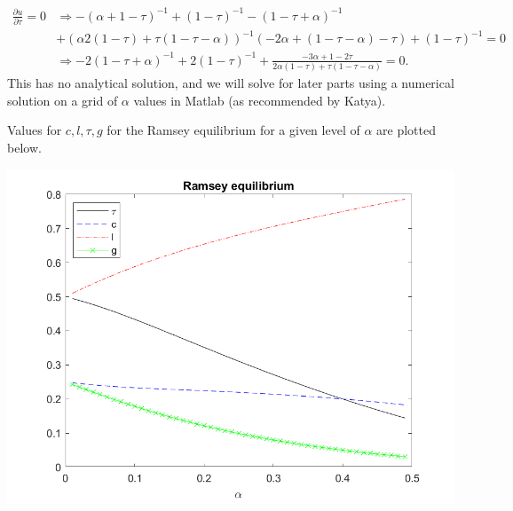 \documentclass[11pt]{article} %
\begin{document}
\begin{align*}
\frac{\partial u}{\partial \tau} = 0 &\Rightarrow -(\alpha +1-\tau)^{-1} + (1-\tau)^{-1} - (1-\tau+\alpha)^{-1} \\&+ (\alpha 2(1-\tau) + \tau (1-\tau - \alpha))^{-1}(-2\alpha + (1-\tau-\alpha)-\tau) +(1-\tau)^{-1} =0\\
&\Rightarrow -2(1-\tau+\alpha)^{-1} + 2(1-\tau)^{-1} +\frac{-3\alpha + 1 - 2\tau}{2\alpha(1-\tau) + \tau(1-\tau-\alpha)} = 0.
\end{align*}
This has no analytical solution, and we will solve for later parts using a numerical solution on a grid of $\alpha$ values in Matlab (as recommended by Katya).

Values for $c,l,\tau,g$ for the Ramsey equilibrium for a given level of $\alpha$ are plotted below.

\includegraphics{ramsey}

\end{document}
